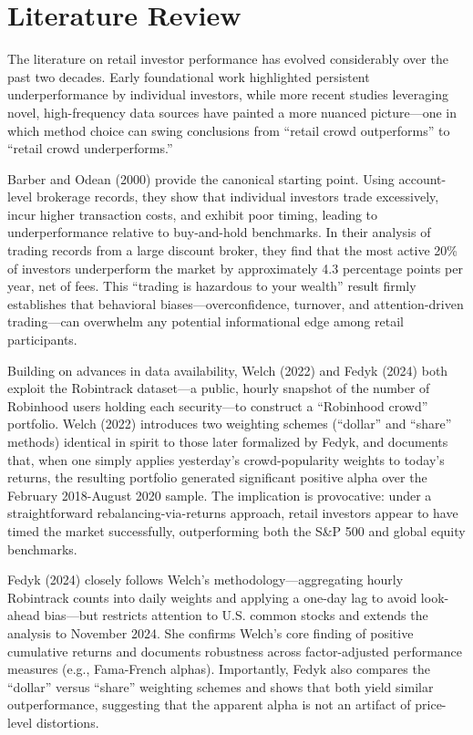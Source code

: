 \section{Literature Review}

The literature on retail investor performance has evolved considerably over the past two decades. Early foundational work highlighted persistent underperformance by individual investors, while more recent studies leveraging novel, high-frequency data sources have painted a more nuanced picture—one in which method choice can swing conclusions from “retail crowd outperforms” to “retail crowd underperforms.”

Barber and Odean (2000) provide the canonical starting point. Using account-level brokerage records, they show that individual investors trade excessively, incur higher transaction costs, and exhibit poor timing, leading to underperformance relative to buy-and-hold benchmarks. 
In their analysis of trading records from a large discount broker, they find that the most active 20\% of investors underperform the market by approximately 4.3 percentage points per year, net of fees. 
This “trading is hazardous to your wealth” result firmly establishes that behavioral biases—overconfidence, turnover, and attention-driven trading—can overwhelm any potential informational edge among retail participants.

Building on advances in data availability, Welch (2022) and Fedyk (2024) both exploit the Robintrack dataset—a public, hourly snapshot of the number of Robinhood users holding each security—to construct a “Robinhood crowd” portfolio. 
Welch (2022) introduces two weighting schemes (“dollar” and “share” methods) identical in spirit to those later formalized by Fedyk, and documents that, when one simply applies yesterday's crowd-popularity weights to today's returns, the resulting portfolio generated significant positive alpha over the February 2018-August 2020 sample. 
The implication is provocative: under a straightforward rebalancing-via-returns approach, retail investors appear to have timed the market successfully, outperforming both the S\&P 500 and global equity benchmarks.

Fedyk (2024) closely follows Welch's methodology—aggregating hourly Robintrack counts into daily weights and applying a one-day lag to avoid look-ahead bias—but restricts attention to U.S. common stocks and extends the analysis to November 2024. 
She confirms Welch's core finding of positive cumulative returns and documents robustness across factor-adjusted performance measures (e.g., Fama-French alphas). 
Importantly, Fedyk also compares the “dollar” versus “share” weighting schemes and shows that both yield similar outperformance, suggesting that the apparent alpha is not an artifact of price-level distortions.

